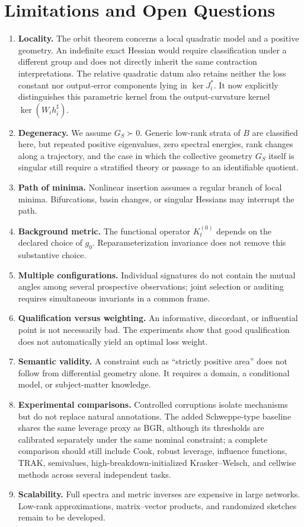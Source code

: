 \documentclass[10pt,a4paper]{article}
\newcommand{\Ker}{\operatorname{ker}}
\begin{document}
\section{Limitations and Open Questions}
\begin{enumerate}
  \item \textbf{Locality.} The orbit theorem concerns a local quadratic model and a positive geometry. An indefinite exact Hessian would require classification under a different group and does not directly inherit the same contraction interpretations. The relative quadratic datum also retains neither the loss constant nor output-error components lying in $\Ker J_i^*$. It now explicitly distinguishes this parametric kernel from the output-curvature kernel $\Ker(W_i h_i^\sharp)$.
  \item \textbf{Degeneracy.} We assume $G_S\succ0$. Generic low-rank strata of $B$ are classified here, but repeated positive eigenvalues, zero spectral energies, rank changes along a trajectory, and the case in which the collective geometry $G_S$ itself is singular still require a stratified theory or passage to an identifiable quotient.
  \item \textbf{Path of minima.} Nonlinear insertion assumes a regular branch of local minima. Bifurcations, basin changes, or singular Hessians may interrupt the path.
  \item \textbf{Background metric.} The functional operator $K_t^{(0)}$ depends on the declared choice of $g_0$. Reparameterization invariance does not remove this substantive choice.
  \item \textbf{Multiple configurations.} Individual signatures do not contain the mutual angles among several prospective observations; joint selection or auditing requires simultaneous invariants in a common frame.
  \item \textbf{Qualification versus weighting.} An informative, discordant, or influential point is not necessarily bad. The experiments show that good qualification does not automatically yield an optimal loss weight.
  \item \textbf{Semantic validity.} A constraint such as ``strictly positive area'' does not follow from differential geometry alone. It requires a domain, a conditional model, or subject-matter knowledge.
  \item \textbf{Experimental comparisons.} Controlled corruptions isolate mechanisms but do not replace natural annotations. The added Schweppe-type baseline shares the same leverage proxy as BGR, although its thresholds are calibrated separately under the same nominal constraint; a complete comparison should still include Cook, robust leverage, influence functions, TRAK, semivalues, high-breakdown-initialized Krasker--Welsch, and cellwise methods across several independent tasks.
  \item \textbf{Scalability.} Full spectra and metric inverses are expensive in large networks. Low-rank approximations, matrix--vector products, and randomized sketches remain to be developed.
\end{enumerate}
\end{document}
